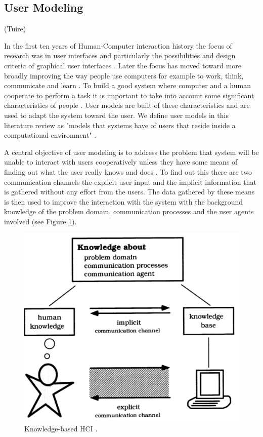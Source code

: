\documentclass{sigchi}
\begin{document}
\subsection{User Modeling}
(Tuire)

In the first ten years of Human-Computer interaction history the focus of research was in user interfaces and particularly the possibilities and design criteria of graphical user interfaces \cite{fischer01}. Later the focus has moved toward more broadly improving the way people use computers for example to work, think, communicate and learn \cite{fischer01}. To build a good system where computer and a human cooperate to perform a task it is important to take into account some significant characteristics of people \cite{rich99}. User models are built of these characteristics and are used to adapt the system toward the user. We define user models in this literature review as "models that systems have of users that reside inside a computational environment" \cite{fischer01}.

A central objective of user modeling is to address the problem that system will be unable to interact with users cooperatively unless they have some means of finding out what the user really knows and does \cite{fischer01}. To find out this there are two communication channels the explicit user input and the implicit information that is gathered without any effort from the users. The data gathered by these means is then used to improve the interaction with the system with the background knowledge of the problem domain, communication processes and the user agents involved (see Figure \ref{know_hci}).

\begin{figure}[htp] %
\caption{Knowledge-based HCI \protect\cite{fischer01}.}   \label{know_hci}
\includegraphics[scale=0.45]{figures/knowledge_hci.pdf} 
\end{figure}
\end{document}
